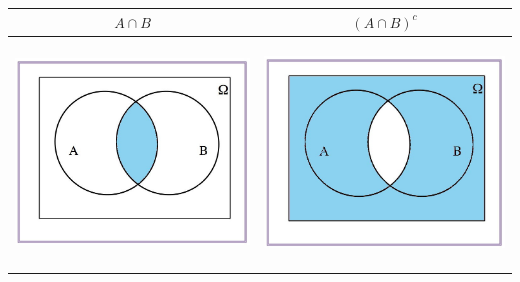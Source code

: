 \documentclass[]{book}
\begin{document}
\begin{longtable}[]{@{}cc@{}}
\toprule
\(A\cap B\) & \((A\cap B)^c\)\tabularnewline
\midrule
\endhead
\includegraphics[width=\textwidth,height=6cm]{Images/proba1dibujos/demorgan1.jpg} & \includegraphics[width=\textwidth,height=6cm]{Images/proba1dibujos/demorgan2.jpg}\tabularnewline
\bottomrule
\end{longtable}
\end{document}
